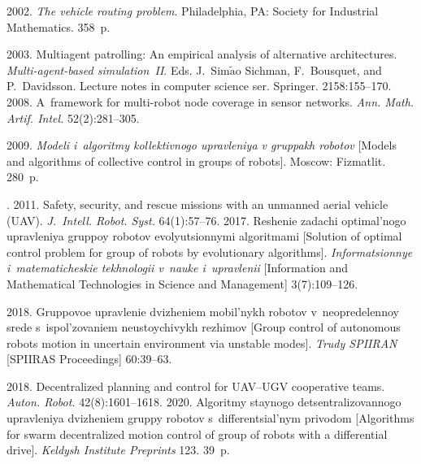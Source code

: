 \begin{multicols}{2}
{{\begin{thebibliography}{99}
 2002. \textit{The vehicle routing problem}. Philadelphia, PA: 
Society for Industrial Mathematics. 358~p. 

 2003. Multiagent patrolling: 
An empirical analysis of alternative architectures. \textit{Multi-agent-based simulation~II}. Eds. 
J.~Sim$\tilde{\mbox{a}}$o Sichman, F.~Bousquet, and P.~Davidsson. Lecture notes in 
computer science ser. Springer. 2158:155--170. 
 2008. A~framework for multi-robot 
node coverage in sensor networks. \textit{Ann. Math. Artif. Intel.} 
52(2):281--305. 

 2009. \textit{Modeli i~algoritmy 
kollektivnogo upravleniya v gruppakh robotov} [Models and algorithms of collective control in 
groups of robots]. Moscow: Fizmatlit. 280~p. 





. 2011. Safety, 
security, and rescue missions with an unmanned aerial vehicle (UAV). \textit{J.~Intell.  
Robot. Syst.} 64(1):57--76. 
 2017. Reshenie zadachi 
optimal'nogo upravleniya gruppoy robotov evolyutsionnymi algoritmami [Solution of optimal control problem for group of robots by
evolutionary algorithms]. \textit{Informatsionnye 
i~matematicheskie tekhnologii v~nauke i~upravlenii} [Information and Mathematical 
Technologies in Science and Management] 3(7):109--126. 

 2018. Gruppovoe upravlenie 
dvizheniem mobil'nykh robotov v~ne\-opre\-de\-len\-noy srede s~ispol'zovaniem neustoychivykh 
rezhimov [Group control of autonomous robots motion in uncertain environment via unstable modes]. 
\textit{Trudy \mbox{SPIIRAN}} [SPIIRAS Proceedings] 60:39--63. 

 2018. 
Decentralized planning and control for UAV--UGV cooperative teams. \textit{Auton. 
Robot.} 42(8):1601--1618. 
 2020. Algoritmy staynogo detsentralizovannogo upravleniya dvizheniem gruppy 
robotov s~differentsial'nym privodom [Algorithms for swarm decentralized motion control of 
group of robots with a differential drive]. \textit{Keldysh Institute Preprints} %
123. 39~p. 


\end{thebibliography}}}
\end{multicols}
